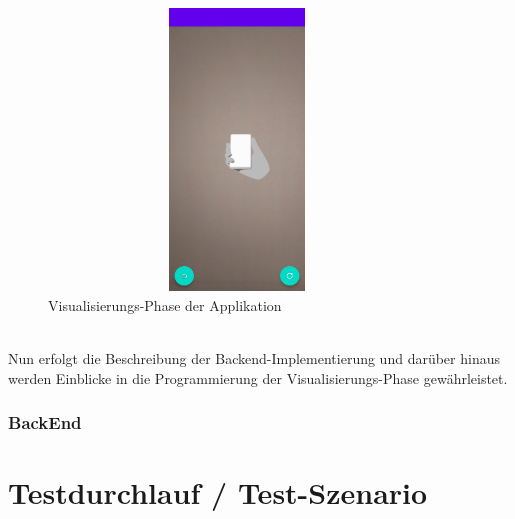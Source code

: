 \begin{figure}[hbt!]
    \centering
    \includegraphics[width=10cm,height=7.5cm,keepaspectratio]{4Umsetzung/Bilder/visual-phase.jpg}
    \caption{Visualisierungs-Phase der Applikation}
    \label{pic:visual}
\end{figure}
\\ 
Nun erfolgt die Beschreibung der Backend-Implementierung und darüber hinaus werden Einblicke in die Programmierung der Visualisierungs-Phase gewährleistet. 
\subsubsection{BackEnd}

\section{Testdurchlauf / Test-Szenario}
\label{chap:testdurchlauf}